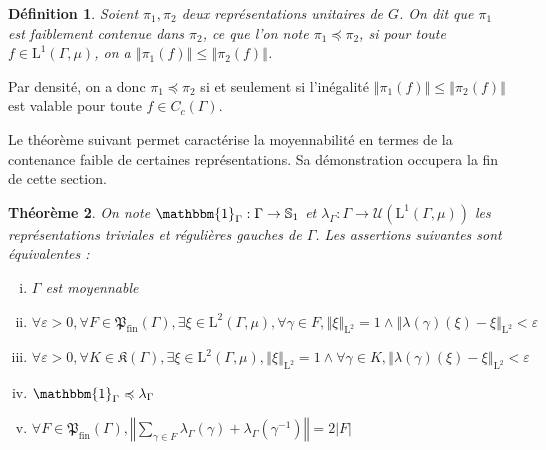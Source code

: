 \documentclass[a4paper,12pt]{article}
\newtheorem{theorem}{Théorème}[section]
\newtheorem{definition}[theorem]{Définition}
\newcommand{\norm}[1]{\left\Vert #1\right\Vert}
\newcommand{\abs}[1]{\left\vert#1\right\vert}
\newcommand{\card}[1]{\abs{#1}}
\newcommand{\indic}{\mathbbm{1}}
\newcommand{\ssi}{si et seulement si }
\newcommand{\inv}{^{-1}}
\newcommand{\finparts}{\mathfrak{P}_{\mathrm{fin}}}
\newcommand{\wle}{\preccurlyeq}
\DeclareMathOperator{\Sp}{Sp}
\begin{document}
\begin{definition}
    Soient $\pi_1, \pi_2$ deux représentations unitaires de $G$. On dit que $\pi_1$ est 
    \emph{faiblement contenue} dans $\pi_2$, ce que l'on note $\pi_1 \wle \pi_2$, 
    si pour toute $f\in\mathrm{L}^1(\Gamma, \mu)$, on a $\norm{\pi_1(f)} \leq \norm{\pi_2(f)}$.
\end{definition}

Par densité, on a donc $\pi_1\wle \pi_2$ \ssi l'inégalité $\norm{\pi_1(f)} \leq \norm{\pi_2(f)}$
est valable pour toute $f\in C_c(\Gamma)$.

Le théorème suivant permet caractérise la moyennabilité en termes de la contenance faible de certaines représentations.
Sa démonstration occupera la fin de cette section.

\begin{theorem}\label{amenable_weak_contain}
    On note $\indic_\Gamma:\Gamma\to\mathbb{S}_1$ et $\lambda_\Gamma:\Gamma\to\mathcal{U}(\mathrm{L}^1(\Gamma, \mu))$
    les représentations triviales et régulières gauches de $\Gamma$. Les assertions suivantes sont équivalentes :
    \begin{enumerate}[(i)]
        \item\label{amenable_weak_contain/amenable} $\Gamma$ est moyennable
        \item\label{amenable_weak_contain/weak_almost_invariant} $\forall\varepsilon>0, \forall F\in\finparts(\Gamma), \exists\xi\in \mathrm{L}^2(\Gamma, \mu), \forall \gamma\in F, \norm{\xi}_{\mathrm{L}^2} = 1 \land \norm{\lambda(\gamma)(\xi) - \xi}_{\mathrm{L}^2}<\varepsilon$
        \item\label{amenable_weak_contain/strong_almost_invariant} $\forall\varepsilon>0, \forall K\in\mathfrak{K}(\Gamma), \exists\xi\in \mathrm{L}^2(\Gamma, \mu), \norm{\xi}_{\mathrm{L}^2} = 1 \land \forall \gamma\in K, \norm{\lambda(\gamma)(\xi) - \xi}_{\mathrm{L}^2}<\varepsilon$
        \item\label{amenable_weak_contain/weak_contain} $\indic_\Gamma\wle\lambda_\Gamma$
        \item\label{amenable_weak_contain/norm_eq_two} $\forall F\in\finparts(\Gamma), \norm{\sum_{\gamma\in F}\lambda_\Gamma(\gamma)+\lambda_\Gamma(\gamma\inv)} = 2\card{F}$
    \end{enumerate}
\end{theorem}
\end{document}
